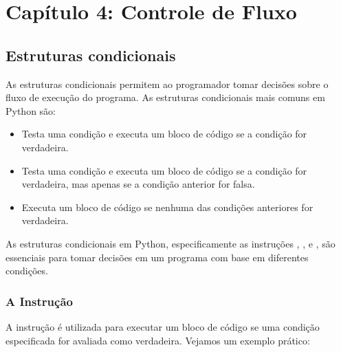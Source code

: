 \documentclass[letterpaper,10pt,english]{jupyterBook}
\begin{document}
\sphinxstepscope


\chapter{Capítulo 4: Controle de Fluxo}
\label{\detokenize{chapters/ch4/ch4:capitulo-4-controle-de-fluxo}}\label{\detokenize{chapters/ch4/ch4::doc}}

\section{Estruturas condicionais}
\label{\detokenize{chapters/ch4/ch4:estruturas-condicionais}}
\sphinxAtStartPar
As estruturas condicionais permitem ao programador tomar decisões sobre o fluxo de execução do programa. As estruturas condicionais mais comuns em Python são:
\begin{itemize}
\item {} 
\sphinxAtStartPar
{} Testa uma condição e executa um bloco de código se a condição for verdadeira.

\item {} 
\sphinxAtStartPar
{} Testa uma condição e executa um bloco de código se a condição for verdadeira, mas apenas se a condição anterior for falsa.

\item {} 
\sphinxAtStartPar
{} Executa um bloco de código se nenhuma das condições anteriores for verdadeira.

\end{itemize}

\sphinxAtStartPar
As estruturas condicionais em Python, especificamente as instruções , , e , são essenciais para tomar decisões em um programa com base em diferentes condições.


\subsection{A Instrução }
\label{\detokenize{chapters/ch4/ch4:a-instrucao-if}}
\sphinxAtStartPar
A instrução  é utilizada para executar um bloco de código se uma condição especificada for avaliada como verdadeira. Vejamos um exemplo prático:
\end{document}
